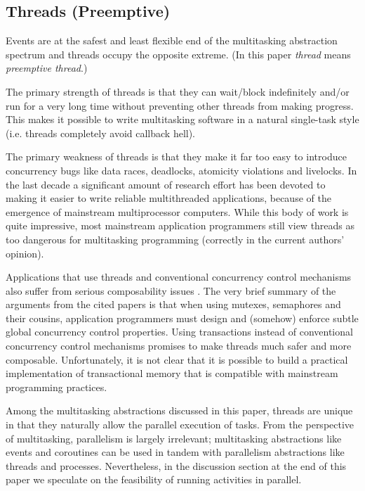 \documentclass[10pt,preprint]{sigplanconf}
\begin{document}
\subsection{Threads (Preemptive)}

Events are at the safest and least flexible end of the multitasking abstraction spectrum and threads occupy the opposite extreme.
(In this paper \emph{thread} means \emph{preemptive thread}.)

The primary strength of threads is that they can wait/block indefinitely and/or run for a very long time without preventing other threads from making progress.
This makes it possible to write multitasking software in a natural single-task style (i.e. threads completely avoid callback hell).

The primary weakness of threads is that they make it far too easy to introduce concurrency bugs like data races, deadlocks, atomicity violations and livelocks.
In the last decade a significant amount of research effort has been devoted to making it easier to write reliable multithreaded applications, because of the emergence of mainstream multiprocessor computers.
While this body of work is quite impressive, most mainstream application programmers still view threads as too dangerous for multitasking programming (correctly in the current authors' opinion).

Applications that use threads and conventional concurrency control mechanisms also suffer from serious composability issues \cite{Harris2005, Grossman2007}.
The very brief summary of the arguments from the cited papers is that when using mutexes, semaphores and their cousins, application programmers must design and (somehow) enforce subtle global concurrency control properties.
Using transactions instead of conventional concurrency control mechanisms promises to make threads much safer and more composable.
Unfortunately, it is not clear that it is possible to build a practical implementation of transactional memory that is compatible with mainstream programming practices.

Among the multitasking abstractions discussed in this paper, threads are unique in that they naturally allow the parallel execution of tasks.
From the perspective of multitasking, parallelism is largely irrelevant; multitasking abstractions like events and coroutines can be used in tandem with parallelism abstractions like threads and processes.
Nevertheless, in the discussion section at the end of this paper we speculate on the feasibility of running activities in parallel.
\end{document}
